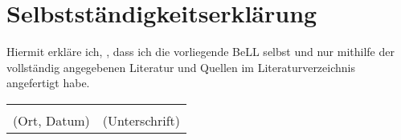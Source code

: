 \section{Selbstständigkeitserklärung}

Hiermit erkläre ich, \underline{\hspace{5cm}}, dass ich die vorliegende BeLL selbst und nur mithilfe 
der vollständig angegebenen Literatur und Quellen im Literaturverzeichnis angefertigt habe.

\vspace{2.5cm}

\begin{tabular}{ll}
    \centering
    \underline{\hspace{6cm}}&\underline{\hspace{6cm}}\\
    (Ort, Datum)&(Unterschrift)\\ 
\end{tabular}